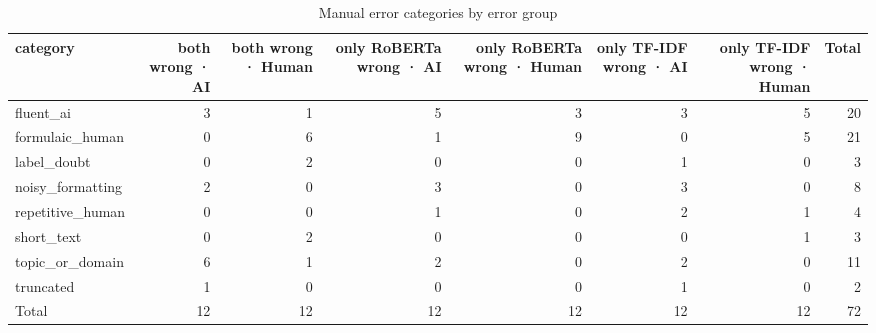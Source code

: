 \begin{table}[!t]
\centering
\caption{Manual error categories by error group}
\label{tab:error_categories}
\footnotesize
\begin{tabular}{lrrrrrrr}
\toprule
\textbf{category} & \textbf{both wrong · AI} & \textbf{both wrong · Human} & \textbf{only RoBERTa wrong · AI} & \textbf{only RoBERTa wrong · Human} & \textbf{only TF-IDF wrong · AI} & \textbf{only TF-IDF wrong · Human} & \textbf{Total} \\
\midrule
fluent\_ai & 3 & 1 & 5 & 3 & 3 & 5 & 20 \\
formulaic\_human & 0 & 6 & 1 & 9 & 0 & 5 & 21 \\
label\_doubt & 0 & 2 & 0 & 0 & 1 & 0 & 3 \\
noisy\_formatting & 2 & 0 & 3 & 0 & 3 & 0 & 8 \\
repetitive\_human & 0 & 0 & 1 & 0 & 2 & 1 & 4 \\
short\_text & 0 & 2 & 0 & 0 & 0 & 1 & 3 \\
topic\_or\_domain & 6 & 1 & 2 & 0 & 2 & 0 & 11 \\
truncated & 1 & 0 & 0 & 0 & 1 & 0 & 2 \\
Total & 12 & 12 & 12 & 12 & 12 & 12 & 72 \\
\bottomrule
\end{tabular}
\end{table}

